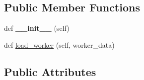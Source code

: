 \subsection*{Public Member Functions}
\begin{DoxyCompactItemize}
\item 
\mbox{\label{classavalon__sdk_1_1worker_1_1worker__details_1_1SGXWorkerDetails_a7c81b350b094098390f8e36fc166c33b}} 
def {\bfseries \+\_\+\+\_\+init\+\_\+\+\_\+} (self)
\item 
def \hyperlink{classavalon__sdk_1_1worker_1_1worker__details_1_1SGXWorkerDetails_ab930010561f9f9b4e380b3dd2b9c6699}{load\+\_\+worker} (self, worker\+\_\+data)
\end{DoxyCompactItemize}
\subsection*{Public Attributes}
